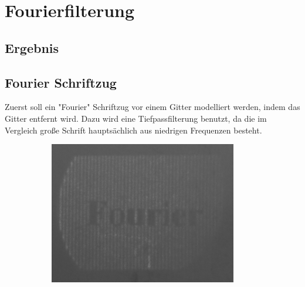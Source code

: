 \section{Fourierfilterung}
\subsection{Ergebnis}
\subsection{Fourier Schriftzug}
Zuerst soll ein "Fourier" Schriftzug vor einem Gitter modelliert werden, indem das Gitter entfernt wird. Dazu wird eine Tiefpassfilterung benutzt, da die im Vergleich große Schrift hauptsächlich aus niedrigen Frequenzen besteht. 


\begin{figure}[h]
\begin{subfigure}[c]{0.5\textwidth}

\includegraphics[width=0.9\textwidth]{Fourier.png}
	      \caption{}
          \label{fig:NiceImage1}
          

\end{subfigure}
\end{figure}
